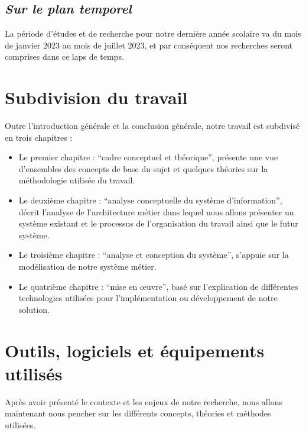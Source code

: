        \subsection[Sur le plan temporel]{\textit{Sur le plan temporel}}
        La période d’études et de recherche pour notre dernière 
        année scolaire va du mois de janvier 2023 au mois de juillet 2023,
        et par conséquent nos recherches seront comprises dans ce laps de temps.
    \section[Subdivision du travail]{Subdivision du travail}
    Outre l’introduction générale et la conclusion générale, notre travail est subdivisé
    en trois chapitres :
    \par
        \begin{itemize}
            \setlength{\itemsep}{0pt}
            \item [\ding{226}] Le premier chapitre : \enquote{cadre conceptuel et théorique}, présente une vue
            d’ensembles des concepts de base du sujet et quelques théories sur la méthodologie
            utilisée du travail.
            \item [\ding{226}] Le deuxième chapitre : \enquote{analyse conceptuelle du système d’information}, 
            décrit l’analyse de l’architecture métier dans lequel nous allons présenter un système existant
            et le processus de l’organisation du travail ainsi que le futur système.
            \item [\ding{226}] Le troisième chapitre : \enquote{analyse et conception du système}, s’appuie sur la
            modélisation de notre système métier.
            \item [\ding{226}] Le quatrième chapitre : \enquote{mise en œuvre}, basé sur l’explication de différentes
            technologies utilisées pour l’implémentation ou développement de notre solution.          
        \end{itemize} 
    \section[Outils, logiciels et équipements utilisés]{Outils, logiciels et équipements utilisés}
    Après avoir présenté le contexte et les enjeux de notre recherche, nous allons maintenant nous pencher sur
    les différents concepts, théories et méthodes utilisées.